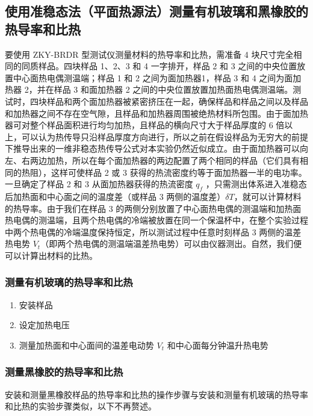 \documentclass[a4paper,utf8]{article}
\begin{document}
    \subsection{使用准稳态法（平面热源法）测量有机玻璃和黑橡胶的热导率和比热}
        要使用 ZKY-BRDR 型测试仪测量材料的热导率和比热，需准备 4 块尺寸完全相同的同质样品。四块样品 1、2、3 和 4 一字排开，样品 2 和 3 之间的中央位置放置中心面热电偶测温端；样品 1 和 2 之间为面加热器1，样品 3 和 4 之间为面加热器 2，并在样品 3 和面加热器 2 之间的中央位置放置加热面热电偶测温端。测试时，四块样品和两个面加热器被紧密挤压在一起，确保样品和样品之间以及样品和加热器之间不存在空气隙，且样品和加热器周围被绝热材料所包围。由于面加热器可对整个样品面积进行均匀加热，且样品的横向尺寸大于样品厚度的 6 倍以上，可以认为热传导只沿样品厚度方向进行，所以之前在假设样品为无穷大的前提下推导出来的一维非稳态热传导公式对本实验仍然近似成立。由于面加热器可以向左、右两边加热，所以在每个面加热器的两边配置了两个相同的样品（它们具有相同的热阻），这样可使样品 2 或 3 获得的热流密度约等于面加热器一半的电功率。一旦确定了样品 2 和 3 从面加热器获得的热流密度 $q_f$ ，只需测出体系进入准稳态后加热面和中心面之间的温度差（或样品 3 两侧的温度差）$\delta T$，就可以计算材料的热导率。由于我们在样品 3 的两侧分别放置了中心面热电偶的测温端和加热面热电偶的测温端，且两个热电偶的冷端被放置在同一个保温杯中，在整个实验过程中两个热电偶的冷端温度保持恒定，所以测试过程中任意时刻样品 3 两侧的温差热电势 $V_t$（即两个热电偶的测温端温差热电势）可以由仪器测出。自然，我们便可以计算出材料的比热。
        \subsubsection{测量有机玻璃的热导率和比热}
        \begin{enumerate}
            \item 安装样品
            \item 设定加热电压
            \item 测量加热面和中心面间的温差电动势 $V_t$ 和中心面每分钟温升热电势
        \end{enumerate}
        \subsubsection{测量黑橡胶的热导率和比热}
        安装和测量黑橡胶样品的热导率和比热的操作步骤与安装和测量有机玻璃的热导率和比热的实验步骤类似，以下不再赘述。
\end{document}
